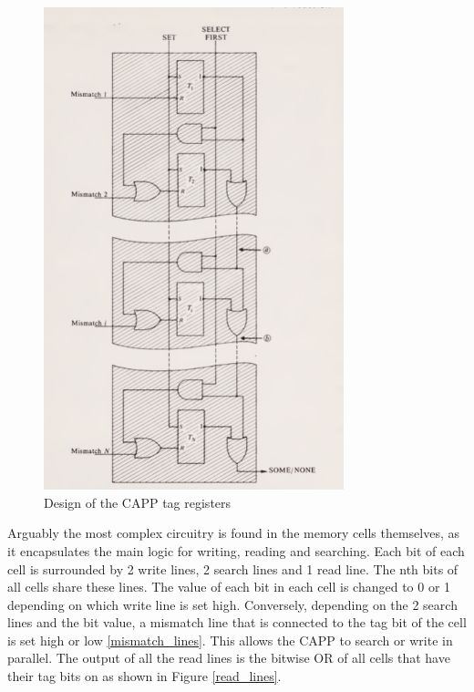 \begin{figure}
  \includegraphics[height=14cm]{FPGA-CAPP research paper/images/tag_registers.png}
  \caption{Design of the CAPP tag registers}
  \label{tag_registers}
\end{figure}

Arguably the most complex circuitry is found in the memory cells themselves, as it encapsulates the main logic for writing, reading and searching. 
Each bit of each cell is surrounded by 2 write lines, 2 search lines and 1 read line. The nth bits of all cells share these lines.
The value of each bit in each cell is changed to 0 or 1 depending on which write line is set high. Conversely, depending on the 2 search lines and the bit value, a mismatch line that is connected to the tag bit of the cell is set high or low  \ref{mismatch_lines}. This allows the CAPP to search or write in parallel. The output of all the read lines is the bitwise OR of all cells that have their tag bits on as shown in Figure \ref{read_lines}. 

